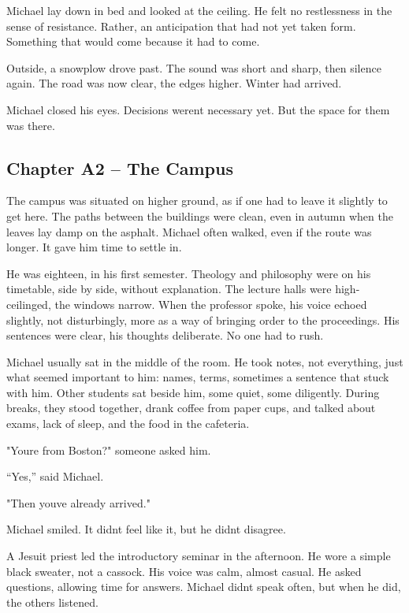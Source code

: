 \documentclass[
]{article}
\begin{document}
Michael lay down in bed and looked at the ceiling. He felt no restlessness in the sense of resistance. Rather, an anticipation that had not yet taken form. Something that would come because it had to come.

Outside, a snowplow drove past. The sound was short and sharp, then silence again. The road was now clear, the edges higher. Winter had arrived.

Michael closed his eyes. Decisions weren\textquotesingle t necessary yet. But the space for them was there.

\subsection{Chapter A2 -- The Campus}\label{chapter-a2-the-campus}

The campus was situated on higher ground, as if one had to leave it slightly to get here. The paths between the buildings were clean, even in autumn when the leaves lay damp on the asphalt. Michael often walked, even if the route was longer. It gave him time to settle in.

He was eighteen, in his first semester. Theology and philosophy were on his timetable, side by side, without explanation. The lecture halls were high-ceilinged, the windows narrow. When the professor spoke, his voice echoed slightly, not disturbingly, more as a way of bringing order to the proceedings. His sentences were clear, his thoughts deliberate. No one had to rush.

Michael usually sat in the middle of the room. He took notes, not everything, just what seemed important to him: names, terms, sometimes a sentence that stuck with him. Other students sat beside him, some quiet, some diligently. During breaks, they stood together, drank coffee from paper cups, and talked about exams, lack of sleep, and the food in the cafeteria.

"You\textquotesingle re from Boston?" someone asked him.

``Yes,'' said Michael.

"Then you\textquotesingle ve already arrived."

Michael smiled. It didn\textquotesingle t feel like it, but he didn\textquotesingle t disagree.

A Jesuit priest led the introductory seminar in the afternoon. He wore a simple black sweater, not a cassock. His voice was calm, almost casual. He asked questions, allowing time for answers. Michael didn\textquotesingle t speak often, but when he did, the others listened.
\end{document}
